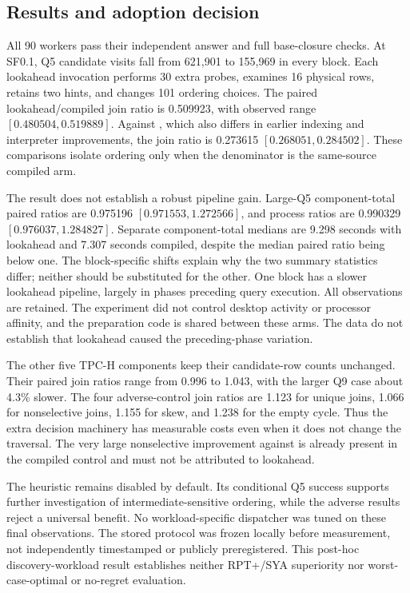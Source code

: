 \subsection{Results and adoption decision}
All 90 workers pass their independent answer and full base-closure checks.
At SF0.1, Q5 candidate visits fall from 621,901 to 155,969 in every block.
Each lookahead invocation performs 30 extra probes, examines 16 physical rows,
retains two hints, and changes 101 ordering choices. The paired
lookahead/compiled join ratio is 0.509923, with observed range
$[0.480504,0.519889]$. Against , which also differs in earlier
indexing and interpreter improvements, the join ratio is 0.273615
$[0.268051,0.284502]$. These comparisons isolate ordering only when the
denominator is the same-source compiled arm.

The result does not establish a robust pipeline gain. Large-Q5 component-total
paired ratios are 0.975196 $[0.971553,1.272566]$, and process ratios are
0.990329 $[0.976037,1.284827]$. Separate component-total medians are 9.298 seconds
with lookahead and 7.307 seconds compiled, despite the median paired ratio
being below one. The block-specific shifts explain why the two summary
statistics differ; neither should be substituted for the other. One block has
a slower lookahead pipeline, largely in phases preceding query execution.
All observations are retained. The experiment did not control desktop activity
or processor affinity, and the preparation code is shared between these arms.
The data do not establish that lookahead caused the preceding-phase variation.

The other five TPC-H components keep their candidate-row counts unchanged.
Their paired join ratios range from 0.996 to 1.043, with the larger Q9 case
about 4.3\% slower. The four adverse-control join ratios are 1.123 for unique
joins, 1.066 for nonselective joins, 1.155 for skew, and 1.238 for the empty
cycle. Thus the extra decision machinery has measurable costs even when it
does not change the traversal. The very large nonselective improvement against
 is already present in the compiled control and must not be
attributed to lookahead.

The heuristic remains disabled by default. Its conditional Q5 success supports
further investigation of intermediate-sensitive ordering, while the adverse
results reject a universal benefit. No workload-specific dispatcher was tuned
on these final observations. The stored protocol was frozen locally before
measurement, not independently timestamped or publicly preregistered. This
post-hoc discovery-workload result establishes neither RPT+/SYA superiority
nor worst-case-optimal or no-regret evaluation.
